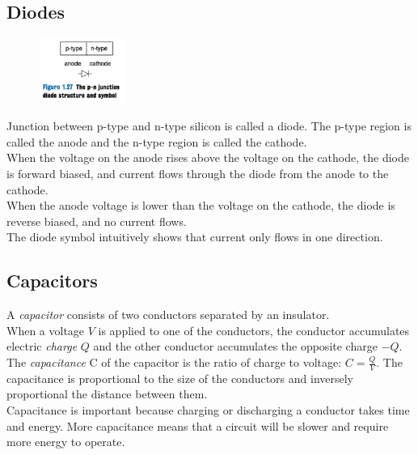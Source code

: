 \documentclass[12pt]{article}
\theoremstyle{definition}
\begin{document}
  \subsection{Diodes}
  \begin{figure}
    \centering
    \includegraphics[width=0.25\textwidth]{pictures/diode.png}
  \end{figure}
  Junction between p-type and n-type silicon is called a diode.
  The p-type region is called the anode and the n-type region is called the cathode. \\
  When the voltage on the anode rises above the voltage on the cathode, the diode is forward biased, and current flows through the diode from the anode to the cathode. \\
  When the anode voltage is lower than the voltage on the cathode, the diode is reverse biased, and no current flows. \\
  The diode symbol intuitively shows that current only flows in one direction.

  \subsection{Capacitors}
  A \emph{capacitor} consists of two conductors separated by an insulator. \\
  When a voltage $V$ is applied to one of the conductors, the conductor accumulates electric \emph{charge} $Q$ and the other conductor accumulates the opposite charge $-Q$. \\
  The \emph{capacitance} C of the capacitor is the ratio of charge to voltage: $C = \frac{Q}{V}$.
  The capacitance is proportional to the size of the conductors and inversely proportional the distance between them. \\
  Capacitance is important because charging or discharging a conductor takes time and energy. More capacitance means that a circuit will be slower and require more energy to operate.
\end{document}
